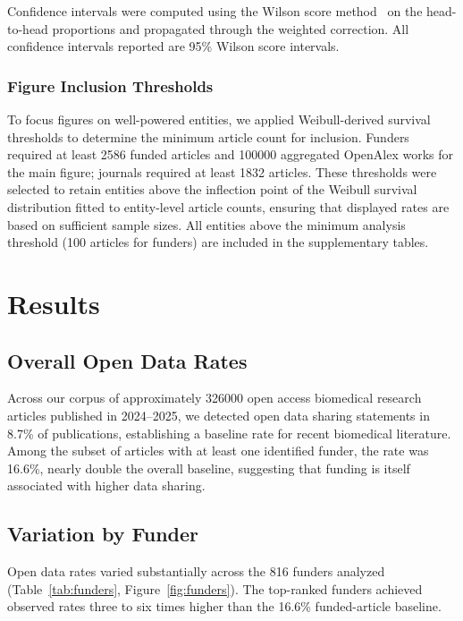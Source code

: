 Confidence intervals were computed using the Wilson score method~\cite{Wilson1927} on the head-to-head proportions and propagated through the weighted correction. All confidence intervals reported are 95\% Wilson score intervals.

\subsubsection{Figure Inclusion Thresholds}

To focus figures on well-powered entities, we applied Weibull-derived survival thresholds to determine the minimum article count for inclusion. Funders required at least \num{2586} funded articles and \num{100000} aggregated OpenAlex works for the main figure; journals required at least \num{1832} articles. These thresholds were selected to retain entities above the inflection point of the Weibull survival distribution fitted to entity-level article counts, ensuring that displayed rates are based on sufficient sample sizes. All entities above the minimum analysis threshold (100 articles for funders) are included in the supplementary tables.


\section{Results}

\subsection{Overall Open Data Rates}

Across our corpus of approximately \num{326000} open access biomedical research articles published in 2024--2025, we detected open data sharing statements in 8.7\% of publications, establishing a baseline rate for recent biomedical literature. Among the subset of articles with at least one identified funder, the rate was 16.6\%, nearly double the overall baseline, suggesting that funding is itself associated with higher data sharing.

\subsection{Variation by Funder}

Open data rates varied substantially across the 816 funders analyzed (Table~\ref{tab:funders}, Figure~\ref{fig:funders}). The top-ranked funders achieved observed rates three to six times higher than the 16.6\% funded-article baseline.

